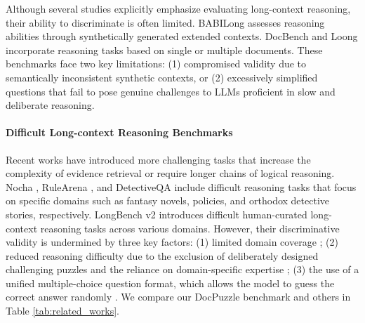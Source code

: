 Although several studies explicitly emphasize evaluating long-context reasoning, their ability to discriminate is often limited. BABILong \cite{BABILong} assesses reasoning abilities through synthetically generated extended contexts. DocBench \cite{DOCBENCH} and Loong \cite{Loong} incorporate reasoning tasks based on single or multiple documents. These benchmarks face two key limitations: (1) compromised validity due to semantically inconsistent synthetic contexts, or (2) excessively simplified questions that fail to pose genuine challenges to LLMs proficient in slow and deliberate reasoning.

\paragraph{Difficult Long-context Reasoning Benchmarks} Recent works have introduced more challenging tasks that increase the complexity of evidence retrieval or require longer chains of logical reasoning. Nocha \cite{NoCha}, RuleArena \cite{RuleArena}, and DetectiveQA \cite{DetectiveQA} include difficult reasoning tasks that focus on specific domains such as fantasy novels, policies, and orthodox detective stories, respectively. LongBench v2 \cite{LongBench2} introduces difficult human-curated long-context reasoning tasks across various domains. However, their discriminative validity is undermined by three key factors: (1) limited domain coverage \cite{NoCha,RuleArena,DetectiveQA}; (2) reduced reasoning difficulty due to the exclusion of deliberately designed challenging puzzles and the reliance on domain-specific expertise \cite{LongBench2}; (3) the use of a unified multiple-choice question format, which allows the model to guess the correct answer randomly \cite{LongBench2}.
We compare our DocPuzzle benchmark and others in Table \ref{tab:related_works}.

